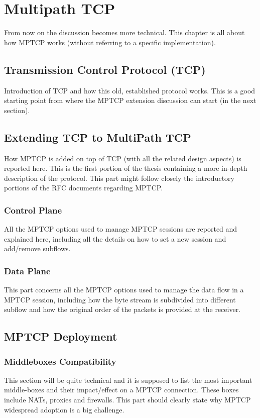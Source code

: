 \chapter{Multipath TCP}
\label{chap:multipathtcp}

From now on the discussion becomes more technical. This chapter is all about how MPTCP works (without referring to a specific implementation).

\section{Transmission Control Protocol (TCP)}
Introduction of TCP and how this old, established protocol works. This is a good starting point from where the MPTCP extension discussion can start (in the next section).

\section{Extending TCP to MultiPath TCP}
How MPTCP is added on top of TCP (with all the related design aspects) is reported here. This is the first portion of the thesis containing a more in-depth description of the protocol. This part might follow closely the introductory portions of the RFC documents regarding MPTCP.

\subsection{Control Plane}
All the MPTCP options used to manage MPTCP sessions are reported and explained here, including all the details on how to set a new session and add/remove subflows.

\subsection{Data Plane}
This part concerns all the MPTCP options used to manage the data flow in a MPTCP session, including how the byte stream is subdivided into different subflow and how the original order of the packets is provided at the receiver.

\section{MPTCP Deployment}
\subsection{Middleboxes Compatibility}
This section will be quite technical and it is supposed to list the most important middle-boxes and their impact/effect on a MPTCP connection. These boxes include NATs, proxies and firewalls. This part should clearly state why MPTCP widespread adoption is a big challenge.

